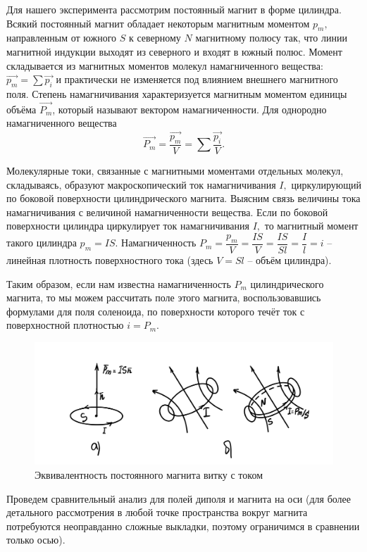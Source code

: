 \documentclass[a4paper,12pt]{article} %
\begin{document}
Для нашего эксперимента рассмотрим постоянный магнит в форме цилиндра. Всякий постоянный магнит обладает некоторым магнитным моментом $p_m,$ направленным от южного $S$ к северному $N$ магнитному полюсу так, что линии магнитной индукции выходят из северного и входят в южный полюс. Момент складывается из магнитных моментов молекул намагниченного вещества: $\overrightarrow{p_m} = \sum\overrightarrow{p_i}$ и практически не изменяется под влиянием внешнего магнитного поля. Степень намагничивания характеризуется магнитным моментом единицы объёма $\overrightarrow{P_m}$, который называют вектором намагниченности. Для однородно намагниченного вещества $$\overrightarrow{P_m} = \dfrac{\overrightarrow{p_m}}{V} = \sum\dfrac{\overrightarrow{p_i}}{V}.$$

Молекулярные токи, связанные с магнитными моментами отдельных молекул, складываясь, образуют макроскопический ток намагничивания $I,$ циркулирующий по боковой поверхности цилиндрического магнита. Выясним связь величины тока намагничивания с величиной намагниченности вещества. Если по боковой поверхности цилиндра циркулирует ток намагничивания $I,$ то магнитный момент такого цилиндра $p_m = IS.$ Намагниченность $P_m = \dfrac{p_m}{V} = \dfrac{IS}{V} = \dfrac{IS}{Sl} = \dfrac{I}{l} = i$ -- линейная плотность поверхностного тока (здесь $V = Sl$ -- объём цилиндра).

Таким образом, если нам известна намагниченность $P_m$ цилиндрического магнита, то
мы можем рассчитать поле этого магнита, воспользовавшись формулами для поля соленоида, по поверхности которого течёт ток с поверхностной плотностью $i = P_m.$

\begin{figure}[h!]
	\centering
	\includegraphics[scale=0.18]{2.JPG}
	\caption{Эквивалентность постоянного магнита витку с током}
\end{figure}

\newpage

Проведем сравнительный анализ для полей диполя и магнита на оси (для более детального рассмотрения в любой точке пространства вокруг магнита потребуются неоправданно сложные выкладки, поэтому ограничимся в сравнении только осью).
\end{document}
